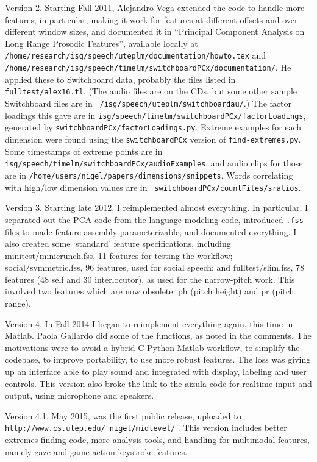 \documentclass[11pt]{article}
\begin{document}
Version 2. Starting Fall 2011, Alejandro Vega extended the code to
handle more features, in particular, making it work for features at
different offsets and over different window sizes, and documented it
in ``Principal Component Analysis on Long Range Prosodic Features'',
available locally at {\tt
  /home/research/isg/speech/uteplm/documentation/howto.tex} and {\tt
  /home/research/isg/speech/timelm/switchboardPCx/documentation/}.  He
applied these to Switchboard data, probably the files listed in {\tt
  fulltest/alex16.tl}.  (The audio files are on the CDs, but some
other sample Switchboard files are in {\tt
  /isg/speech/uteplm/switchboardau/}.)  The factor loadings this
gave are in {\tt isg/speech/timelm/switchboardPCx/factorLoadings},
generated by {\tt switchboardPCx/factorLoadings.py}.  Extreme examples
for each dimension were found using the {\tt switchboardPCx} version
of {\tt find-extremes.py}.  Some timestamps of extreme points are in
{\tt isg/speech/timelm/switchboardPCx/audioExamples}, and audio clips
for those are in {\tt /home/users/nigel/papers/dimensions/snippets}.
Words correlating with high/low dimension values are in {\tt
  switchboardPCx/countFiles/sratios}.

Version 3. Starting late 2012, I reimplemented almost everything.  In
particular, I separated out the PCA code from the language-modeling
code, introduced {\tt .fss} files to made feature assembly
parameterizable, and documented everything.  I also created some
`standard' feature specifications, including minitest/minicrunch.fss,
11 features for testing the workflow; social/symmetric.fss, 96
features, used for social speech; and fulltest/slim.fss, 78 features
(48 self and 30 interlocutor), as used for the narrow-pitch work.
This involved two features which are now obsolete: ph (pitch height)
and pr (pitch range).  

Version 4.  In Fall 2014 I began to reimplement everything again, this
time in Matlab.  Paola Gallardo did some of the functions, as noted in
the comments.  The motivations were to avoid a hybrid C-Python-Matlab
workflow, to simplify the codebase, to improve portability, to use
more robust features.  The loss was giving up an interface able to
play sound and integrated with display, labeling and user controls.
This version also broke the link to the aizula code for realtime input
and output, using microphone and speakers.

Version 4.1, May 2015, was the first public release, uploaded to {\tt
  http://www.cs.utep.edu/ nigel/midlevel/} .  This version includes
better extremes-finding code, more analysis tools, and handling for
multimodal features, namely gaze and game-action keystroke features.
\end{document}
